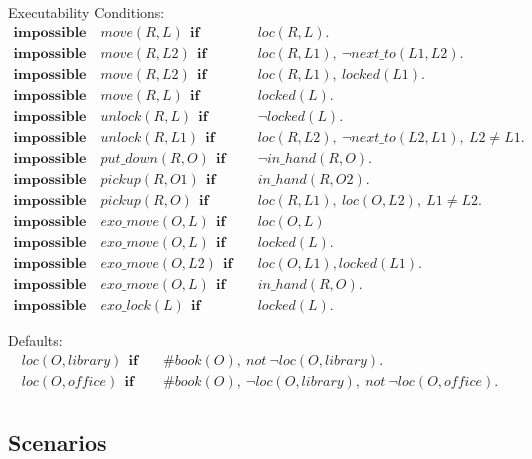 \documentclass[11pt, oneside]{article}
\begin{document}
Executability Conditions:
\begin{align*}
  \mathbf{impossible}\quad move(R, L)~~\mathbf{if}&\quad loc(R,L).\\
  \mathbf{impossible}\quad move(R, L2)~~\mathbf{if}&\quad loc(R,L1),~\neg next\_to(L1,L2).\\
  \mathbf{impossible}\quad move(R,L2)~~\mathbf{if}&\quad loc(R,L1),~locked(L1).\\
  \mathbf{impossible}\quad move(R,L)~~\mathbf{if}&\quad locked(L).\\
  \mathbf{impossible}\quad unlock(R, L)~~\mathbf{if}&\quad \neg locked(L).\\
  \mathbf{impossible}\quad unlock(R, L1)~~\mathbf{if}&\quad loc(R,L2),~\neg next\_to(L2,L1),~L2\neq L1.\\
  \mathbf{impossible}\quad put\_down(R,O)~~\mathbf{if}&\quad \neg in\_hand(R,O).\\
  \mathbf{impossible}\quad pickup(R,O1)~~\mathbf{if}&\quad in\_hand(R,O2).\\
  \mathbf{impossible}\quad pickup(R,O)~~\mathbf{if}&\quad loc(R,L1),~loc(O,L2),~L1 \neq L2.\\
  \mathbf{impossible}\quad exo\_move(O,L)~~\mathbf{if}&\quad loc(O,L)\\
  \mathbf{impossible}\quad exo\_move(O,L)~~\mathbf{if}&\quad locked(L).\\
  \mathbf{impossible}\quad exo\_move(O,L2)~~\mathbf{if}&\quad loc(O,L1), locked(L1).\\
  \mathbf{impossible}\quad exo\_move(O,L)~~\mathbf{if}&\quad in\_hand(R,O).\\
  \mathbf{impossible}\quad exo\_lock(L)~~\mathbf{if}&\quad locked(L).
\end{align*}

Defaults:
\begin{align*}
  loc(O, library)~~\mathbf{if}&\quad \#book(O),~not~\neg loc(O, library).\\
  loc(O, office)~~\mathbf{if}&\quad \#book(O),~\neg loc(O, library),~not~\neg loc(O, office).\\
\end{align*}
	 			  				 			  	 			             


\subsection{Scenarios}
\end{document}
